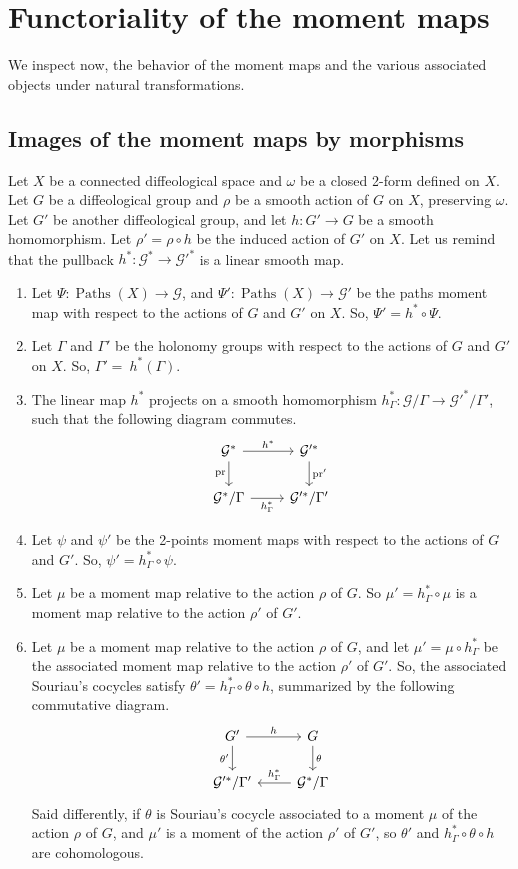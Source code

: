 \documentclass[10pt,reqno,twoside]{amsart}
\newcommand{\cG}{\mathcal{G}}
\DeclareMathOperator{\pr}{pr}
\DeclareMathOperator{\Paths}{Paths}
\theoremstyle{plain}
\theoremstyle{definition}
\newcommand{\article}[1]{\subsection{#1}}
\begin{document}
  \section{Functoriality of the moment maps}
  
  We inspect now,
  the behavior of the moment maps and the various associated objects under natural transformations.
  
  \article{Images of the moment maps by morphisms}
  \label{Images-of-the-moment-maps-by-morphisms}
  Let $X$ be a connected diffeological space and $\omega$ be a closed 2-form defined on $X$.
  Let $G$ be a diffeological group and $\rho$ be a smooth action of $G$ on $X$,
  preserving $\omega$.
  Let $G'$ be another diffeological group,
  and let $h : G' \to G$ be a smooth homomorphism.
  Let $\rho' = \rho \circ h$ be the induced action of $G'$ on $X$.
  Let us remind that the pullback $h^* : \cG^* \to \cG'^{*}$ is a linear smooth map.
  \begin{enumerate}
    \item Let $\Psi : \Paths(X) \to \cG$, and $\Psi' : \Paths(X) \to \cG'$ be the paths moment map with respect to the actions of $G$ and $G'$ on $X$. So, $\Psi' = h^* \circ \Psi$.
    \item Let $\Gamma$ and $\Gamma'$ be the holonomy groups with respect to the actions of $G$ and $G'$ on $X$. So, $\Gamma' = \ h^*(\Gamma)$.
    \item The linear map $h^*$ projects on a smooth homomorphism $h^*_\Gamma : \cG/\Gamma \to \cG'^{*} / \Gamma'$, such that the following diagram commutes.
    \[
    \begin{tikzcd}
      \cG^* \arrow[r, "h^*"] \arrow[d, "\pr"'] & \cG'^* \arrow[d, "\pr'"] \\
      \cG^*/\Gamma \arrow[r, "h^*_\Gamma"'] & \cG'^*/\Gamma'
    \end{tikzcd}
    \]
    \item Let $\psi$ and $\psi'$ be the 2-points moment maps with respect to the actions of $G$ and $G'$. So, $\psi' = h^*_\Gamma \circ \psi$.
    \item Let $\mu$ be a moment map relative to the action $\rho$ of $G$. So $\mu' = h^*_\Gamma \circ \mu$ is a moment map relative to the action $\rho'$ of $G'$.
    \item Let $\mu$ be a moment map relative to the action $\rho$ of $G$, and let $\mu' = \mu \circ h^*_\Gamma$ be the associated moment map relative to the action $\rho'$ of $G'$. So, the associated Souriau's cocycles satisfy $\theta' = h^*_\Gamma \circ \theta \circ h$, summarized by the following commutative diagram.
    \[
    \begin{tikzcd}
      G' \arrow[r, "h"] \arrow[d, "\theta'"'] & G \arrow[d, "\theta"] \\
      \cG'^*/\Gamma' & \cG^*/\Gamma \arrow[l, "h^*_\Gamma"']
    \end{tikzcd}
    \]
    Said differently, if $\theta$ is Souriau's cocycle associated to a moment $\mu$ of the action $\rho$ of $G$,
    and $\mu'$ is a moment of the action $\rho'$ of $G'$,
    so $\theta'$ and $h^*_\Gamma \circ \theta \circ h$ are cohomologous.
  \end{enumerate}
\end{document}
